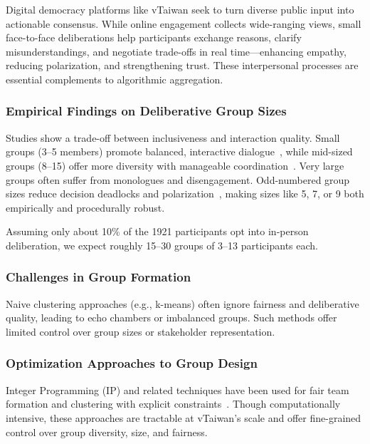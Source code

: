 Digital democracy platforms like vTaiwan seek to turn diverse public input into actionable consensus.
While online engagement collects wide-ranging views, small face-to-face deliberations help participants
exchange reasons, clarify misunderstandings, and negotiate trade-offs in real time—enhancing empathy,
reducing polarization, and strengthening trust.
These interpersonal processes are essential complements to algorithmic aggregation.

\subsubsection*{Empirical Findings on Deliberative Group Sizes}\label{subsec:group_sizes}

Studies show a trade-off between inclusiveness and interaction quality.
Small groups (3–5 members) promote balanced, interactive dialogue~\parencite{fay2000group},
while mid-sized groups (8–15) offer more diversity with manageable
coordination~\parencite{involve_citizensjury, fishkin2009deliberative}.
Very large groups often suffer from monologues and disengagement.
Odd-numbered group sizes reduce decision deadlocks and polarization~\parencite{menon2011oddgroups},
making sizes like 5, 7, or 9 both empirically and procedurally robust.

Assuming only about 10\% of the 1921 participants opt into in-person deliberation,
we expect roughly 15–30 groups of 3–13 participants each.

\subsubsection*{Challenges in Group Formation}

Naive clustering approaches (e.g., k-means) often ignore fairness and deliberative quality,
leading to echo chambers or imbalanced groups.
Such methods offer limited control over group sizes or stakeholder representation.

\subsubsection*{Optimization Approaches to Group Design}

Integer Programming (IP) and related techniques have been used for fair team formation and clustering
with explicit constraints~\parencite{anagnostopoulos2012groupformation, celis2018fair}.
Though computationally intensive, these approaches are tractable at vTaiwan’s scale and offer
fine-grained control over group diversity, size, and fairness.
